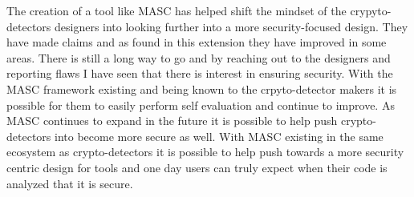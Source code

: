 The creation of a tool like MASC has helped shift the mindset of the crypyto-detectors designers into looking further into a more security-focused design. They have made claims and as found in this extension they have improved in some areas. There is still a long way to go and by reaching out to the designers and reporting flaws I have seen that there is interest in ensuring security. With the MASC framework existing and being known to the crpyto-detector makers it is possible for them to easily perform self evaluation and continue to improve. As MASC continues to expand in the future it is possible to help push crypto-detectors into become more secure as well. With MASC existing in the same ecosystem as crypto-detectors it is possible to help push towards a more security centric design for tools and one day users can truly expect when their code is analyzed that it is secure.